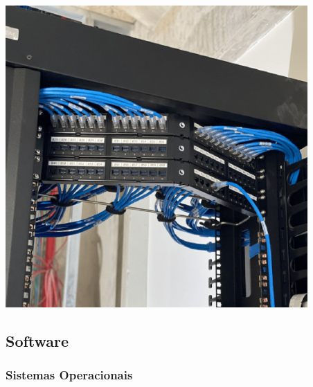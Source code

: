 \documentclass[
]{book}
\begin{document}
\includegraphics[width=4.54167in,height=\textheight]{images/InfraEstrutura/Redes/cabos.jpg}

\subsection{Software}\label{software}

\subsubsection{Sistemas Operacionais}\label{sistemas-operacionais}
\end{document}
